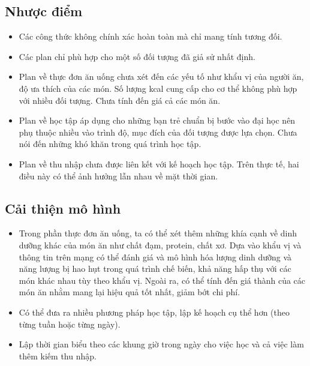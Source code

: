 \subsection{Nhược điểm}
\begin{itemize}
    \item Các công thức không chính xác hoàn toàn mà chỉ mang tính tương đối.
    \item Các plan chỉ phù hợp cho một số đối tượng đã giả sử nhất định.
    \item Plan về thực đơn ăn uống chưa xét đến các yếu tố như khẩu vị của người ăn, độ ưa thích của các món. Số lượng kcal cung cấp cho cơ thể không phù hợp với nhiều đối tượng. Chưa tính đến giá cả các món ăn.
    \item Plan về học tập áp dụng cho những bạn trẻ chuẩn bị bước vào đại học nên phụ thuộc nhiều vào trình độ, mục đích của đối tượng được lựa chọn. Chưa nói đến những khó khăn trong quá trình học tập.
    \item Plan về thu nhập chưa được liên kết với kế hoạch học tập. Trên thực tế, hai điều này có thể ảnh hưởng lẫn nhau về mặt thời gian.
\end{itemize}
\subsection{Cải thiện mô hình}
\begin{itemize}
    \item Trong phần thực đơn ăn uống, ta có thể xét thêm những khía cạnh về dinh dưỡng khác của món ăn như chất đạm, protein, chất xơ. Dựa vào khẩu vị và thông tin trên mạng có thể đánh giá và mô hình hóa lượng dinh dưỡng và năng lượng bị hao hụt trong quá trình chế biến, khả năng hấp thụ với các món khác nhau tùy theo khẩu vị. Ngoài ra, có thể tính đến giá thành của các món ăn nhằm mang lại hiệu quả tốt nhất, giảm bớt chi phí.
    \item Có thể đưa ra nhiều phương pháp học tập, lập kế hoạch cụ thể hơn (theo từng tuần hoặc từng ngày).
    \item Lập thời gian biểu theo các khung giờ trong ngày cho việc học và cả việc làm thêm kiếm thu nhập.
\end{itemize}
